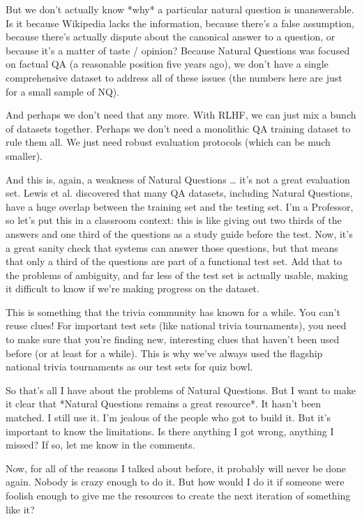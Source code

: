 But we don’t actually know *why* a particular natural question is unanswerable.  Is it because Wikipedia lacks the information, because there’s a false assumption, because there’s actually dispute about the canonical answer to a question, or because it’s a matter of taste / opinion?  Because Natural Questions was focused on factual QA (a reasonable position five years ago), we don’t have a single comprehensive dataset to address all of these issues (the numbers here are just for a small sample of NQ).

And perhaps we don’t need that any more.  With RLHF, we can just mix a bunch of datasets together.  Perhaps we don’t need a monolithic QA training dataset to rule them all.  We just need robust evaluation protocols (which can be much smaller). 

And this is, again, a weakness of Natural Questions … it’s not a great evaluation set.  Lewis et al. discovered that many QA datasets, including Natural Questions, have a huge overlap between the training set and the testing set.  I’m a Professor, so let’s put this in a classroom context: this is like giving out two thirds of the answers and one third of the questions as a study guide before the test.  Now, it’s a great sanity check that systems can answer those questions, but that means that only a third of the questions are part of a functional test set.  Add that to the problems of ambiguity, and far less of the test set is actually usable, making it difficult to know if we’re making progress on the dataset.

This is something that the trivia community has known for a while.  You can’t reuse clues!  For important test sets (like national trivia tournaments), you need to make sure that you’re finding new, interesting clues that haven’t been used before (or at least for a while).  This is why we’ve always used the flagship national trivia tournaments as our test sets for quiz bowl.

So that’s all I have about the problems of Natural Questions.  But I want to make it clear that *Natural Questions remains a great resource*.  It hasn’t been matched.  I still use it.  I’m jealous of the people who got to build it.  But it’s important to know the limitations.  Is there anything I got wrong, anything I missed?  If so, let me know in the comments.

Now, for all of the reasons I talked about before, it probably will never be done again.  Nobody is crazy enough to do it.  But how would I do it if someone were foolish enough to give me the resources to create the next iteration of something like it?

